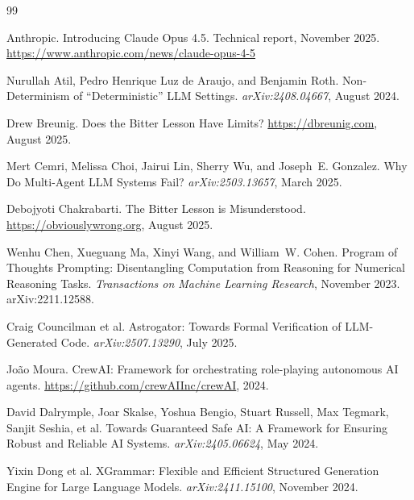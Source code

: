 \documentclass[11pt]{article}
\begin{document}


\begin{thebibliography}{99}

Anthropic.
\newblock Introducing Claude Opus 4.5.
\newblock Technical report, November 2025.
\newblock \url{https://www.anthropic.com/news/claude-opus-4-5}

Nurullah Atil, Pedro Henrique Luz de Araujo, and Benjamin Roth.
\newblock Non-Determinism of ``Deterministic'' LLM Settings.
\newblock \emph{arXiv:2408.04667}, August 2024.

Drew Breunig.
\newblock Does the Bitter Lesson Have Limits?
\newblock \url{https://dbreunig.com}, August 2025.

Mert Cemri, Melissa Choi, Jairui Lin, Sherry Wu, and Joseph~E. Gonzalez.
\newblock Why Do Multi-Agent LLM Systems Fail?
\newblock \emph{arXiv:2503.13657}, March 2025.

Debojyoti Chakrabarti.
\newblock The Bitter Lesson is Misunderstood.
\newblock \url{https://obviouslywrong.org}, August 2025.

Wenhu Chen, Xueguang Ma, Xinyi Wang, and William~W. Cohen.
\newblock Program of Thoughts Prompting: Disentangling Computation from Reasoning for Numerical Reasoning Tasks.
\newblock \emph{Transactions on Machine Learning Research}, November 2023.
\newblock arXiv:2211.12588.

Craig Councilman et al.
\newblock Astrogator: Towards Formal Verification of LLM-Generated Code.
\newblock \emph{arXiv:2507.13290}, July 2025.

Jo\~{a}o Moura.
\newblock CrewAI: Framework for orchestrating role-playing autonomous AI agents.
\newblock \url{https://github.com/crewAIInc/crewAI}, 2024.

David Dalrymple, Joar Skalse, Yoshua Bengio, Stuart Russell, Max Tegmark, Sanjit Seshia, et al.
\newblock Towards Guaranteed Safe AI: A Framework for Ensuring Robust and Reliable AI Systems.
\newblock \emph{arXiv:2405.06624}, May 2024.

Yixin Dong et al.
\newblock XGrammar: Flexible and Efficient Structured Generation Engine for Large Language Models.
\newblock \emph{arXiv:2411.15100}, November 2024.


\end{thebibliography}
\end{document}
